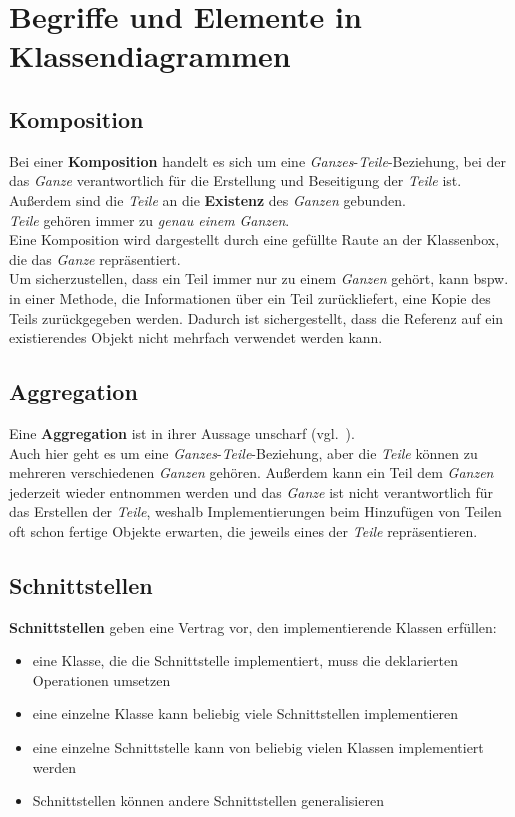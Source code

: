 \section{Begriffe und Elemente in Klassendiagrammen}

\subsection{Komposition}
Bei einer \textbf{Komposition} handelt es sich um eine \textit{Ganzes}-\textit{Teile}-Beziehung, bei der das \textit{Ganze} verantwortlich für die Erstellung und Beseitigung der \textit{Teile} ist.
Außerdem sind die \textit{Teile} an die \textbf{Existenz} des \textit{Ganzen} gebunden.\\
\textit{Teile} gehören immer zu \textit{genau einem} \textit{Ganzen}.\\
Eine Komposition wird dargestellt durch eine gefüllte Raute an der Klassenbox, die das \textit{Ganze} repräsentiert.\\

\noindent
Um sicherzustellen, dass ein Teil immer nur zu einem \textit{Ganzen} gehört, kann bspw. in einer Methode, die Informationen über ein Teil zurückliefert, eine Kopie des Teils zurückgegeben werden.
Dadurch ist sichergestellt, dass die Referenz auf ein existierendes Objekt nicht mehrfach verwendet werden kann.

\subsection{Aggregation}
Eine \textbf{Aggregation} ist in ihrer \semantischen Aussage unscharf (vgl.~\cite[40]{Buh09}).\\
Auch hier geht es um eine \textit{Ganzes}-\textit{Teile}-Beziehung, aber die \textit{Teile} können zu mehreren verschiedenen \textit{Ganzen} gehören.
Außerdem kann ein Teil dem \textit{Ganzen} jederzeit wieder entnommen werden und das \textit{Ganze} ist nicht verantwortlich für das Erstellen der \textit{Teile}, weshalb Implementierungen beim Hinzufügen von Teilen oft schon fertige Objekte erwarten, die jeweils eines der \textit{Teile} repräsentieren.

\subsection{Schnittstellen}
\textbf{Schnittstellen} geben eine Vertrag vor, den implementierende Klassen erfüllen:

\begin{itemize}
    \item eine Klasse, die die Schnittstelle implementiert, muss die deklarierten Operationen umsetzen
    \item eine einzelne Klasse kann beliebig viele Schnittstellen implementieren
    \item eine einzelne Schnittstelle kann von beliebig vielen Klassen implementiert werden
    \item Schnittstellen können andere Schnittstellen generalisieren
\end{itemize}

